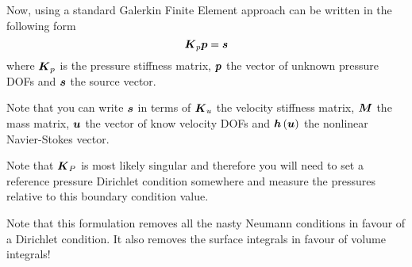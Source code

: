 Now, using a standard Galerkin Finite Element approach
 can be written in the following form
 \begin{equation}
   \matr{K}_{p}\vect{p}=\vect{s}
  \label{eqn:PressurePoissonFinalWeakForm}
\end{equation}
where $\matr{K}_{p}$ is the pressure stiffness matrix, $\vect{p}$ the vector of unknown
pressure DOFs and $\vect{s}$ the source vector. 

Note that you can write
$\vect{s}$ in terms of $\matr{K}_{u}$ the velocity
stiffness matrix, $\matr{M}$ the mass matrix, $\vect{u}$ the vector of know
velocity DOFs and $\fnof{\vect{h}}{\vect{u}}$ the nonlinear Navier-Stokes
vector.

Note that $\matr{K}_{P}$ is most likely singular and therefore you will need to
set a reference pressure Dirichlet condition somewhere and measure the
pressures relative to this boundary condition value.

Note that this formulation removes all the nasty Neumann conditions in favour
of a Dirichlet condition. It also removes the surface integrals in favour of
volume integrals!

\newpage 

